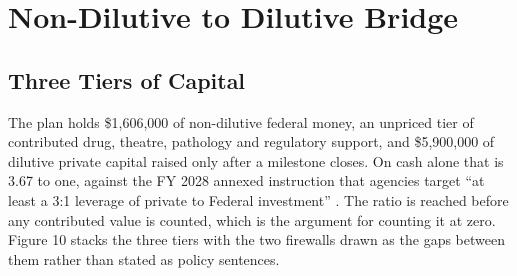 \section{Non-Dilutive to Dilutive Bridge}

\subsection{Three Tiers of Capital}

The plan holds \$1,606,000 of non-dilutive federal money, an unpriced tier of
contributed drug, theatre, pathology and regulatory support, and \$5,900,000 of
dilutive private capital raised only after a milestone closes. On cash alone
that is 3.67 to one, against the FY 2028 annexed instruction that agencies
target ``at least a 3:1 leverage of private to Federal investment''
\cite{kratsiosvought2026fy2028priorities}. The ratio is reached before any
contributed value is counted, which is the argument for counting it at zero.
Figure 10 stacks the three tiers with the two firewalls drawn as the gaps
between them rather than stated as policy sentences.


